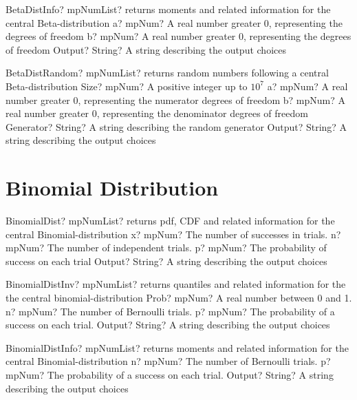 \documentclass[12pt,a4paper,openany]{book}
\begin{document}
\begin{mpFunctionsExtract}
\mpFunctionThree
{BetaDistInfo? mpNumList? returns moments and related information for the central Beta-distribution}
{a? mpNum? A real number greater 0, representing the degrees of freedom}
{b? mpNum? A real number greater 0, representing the degrees of freedom}
{Output? String? A string describing the output choices}
\end{mpFunctionsExtract}

\begin{mpFunctionsExtract}
\mpFunctionFive
{BetaDistRandom? mpNumList? returns random numbers following a central Beta-distribution}
{Size? mpNum? A positive integer up to $10^7$}
{a? mpNum? A real number greater 0, representing the numerator  degrees of freedom}
{b? mpNum? A real number greater 0, representing the denominator degrees of freedom}
{Generator? String? A string describing the random generator}
{Output? String? A string describing the output choices}
\end{mpFunctionsExtract}

\section{Binomial Distribution}

\begin{mpFunctionsExtract}
\mpFunctionFour
{BinomialDist? mpNumList? returns pdf, CDF and related information for the central Binomial-distribution}
{x? mpNum? The number of successes in trials.}
{n? mpNum? The number of independent trials.}
{p? mpNum? The probability of success on each trial}
{Output? String? A string describing the output choices}
\end{mpFunctionsExtract}

\begin{mpFunctionsExtract}
\mpFunctionFour
{BinomialDistInv? mpNumList? returns quantiles and related information for the the central binomial-distribution}
{Prob? mpNum? A real number between 0 and 1.}
{n? mpNum? The number of Bernoulli trials.}
{p? mpNum? The probability of a success on each trial.}
{Output? String? A string describing the output choices}
\end{mpFunctionsExtract}

\begin{mpFunctionsExtract}
\mpFunctionThree
{BinomialDistInfo? mpNumList? returns moments and related information for the central Binomial-distribution}
{n? mpNum? The number of Bernoulli trials.}
{p? mpNum? The probability of a success on each trial.}
{Output? String? A string describing the output choices}
\end{mpFunctionsExtract}
\end{document}
